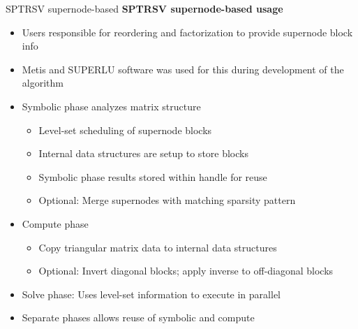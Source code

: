 \begin{frame}[fragile]{SPTRSV supernode-based}
\textbf{SPTRSV supernode-based usage}

  \begin{itemize}
      \item Users responsible for reordering and factorization to provide supernode block info
      \item Metis and SUPERLU software was used for this during development of the algorithm
      \item Symbolic phase analyzes matrix structure
      \begin{itemize}
        \item Level-set scheduling of supernode blocks
        \item Internal data structures are setup to store blocks
        \item Symbolic phase results stored within handle for reuse
        \item Optional: Merge supernodes with matching sparsity pattern
      \end{itemize}
      \item Compute phase
      \begin{itemize}
        \item Copy triangular matrix data to internal data structures
        \item Optional: Invert diagonal blocks; apply inverse to off-diagonal blocks
      \end{itemize}
      \item Solve phase: Uses level-set information to execute in parallel
      \item Separate phases allows reuse of symbolic and compute
  \end{itemize}

\end{frame}


